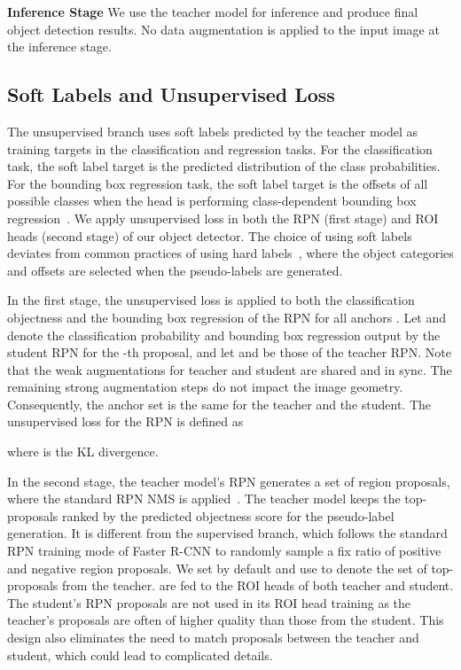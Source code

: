 \documentclass[final]{cvpr}
\begin{document}
\noindent\textbf{Inference Stage} We use the teacher model for inference and produce final object detection results.
No data augmentation is applied to the input image at the inference stage.

\subsection{Soft Labels and Unsupervised Loss}

The unsupervised branch uses soft labels predicted by the teacher model as training targets in the classification and regression tasks.
For the classification task, the soft label target is the predicted distribution of the class probabilities. 
For the bounding box regression task, the soft label target is the offsets of all possible classes when the head is performing class-dependent bounding box regression~\cite{girshick2015fast}. 
We apply unsupervised loss in both the RPN (first stage) and ROI heads (second stage) of our object detector. 
The choice of using soft labels deviates from common practices of using hard labels~\cite{sohn2020simple, sohn2020fixmatch}, where the object categories and offsets are selected when the pseudo-labels are generated.

In the first stage, the unsupervised loss is applied to both the classification objectness and the bounding box regression of the RPN for all anchors .
Let  and  denote the classification probability and bounding box regression output by the student RPN for the -th proposal, and let  and  be those of the teacher RPN. 
Note that the weak augmentations for teacher and student are shared and in sync.
The remaining strong augmentation steps do not impact the image geometry. Consequently, the anchor set is the same for the teacher and the student.
The unsupervised loss for the RPN is defined as

where  is the KL divergence. 

In the second stage, the teacher model's RPN generates a set of region proposals, where the standard RPN NMS is applied~\cite{ren2015faster}. 
The teacher model keeps the top- proposals ranked by the predicted objectness score for the pseudo-label generation.
It is different from the supervised branch, which follows the standard RPN training mode of Faster R-CNN to randomly sample a fix ratio of positive and negative region proposals. 
We set  by default and use  to denote the set of top- proposals from the teacher. 
 are fed to the ROI heads of both teacher and student. 
The student's RPN proposals are not used in its ROI head training as the teacher's proposals are often of higher quality than those from the student. 
This design also eliminates the need to match proposals between the teacher and student, which could lead to complicated details. 
\end{document}
